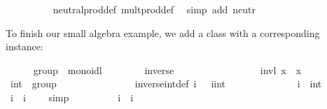 \begin{isabellebody}
\ \ \ \ \ \ \ \ \isamarkupfalse%
\ neutral{\isacharunderscore}prod{\isacharunderscore}def\ mult{\isacharunderscore}prod{\isacharunderscore}def\ \isamarkupfalse%
\ {\isacharparenleft}simp\ add{\isacharcolon}\ neutr{\isacharparenright}\isanewline
\ \ \ \ \isamarkupfalse%
%
\endisatagproof
{\isafoldproof}%
%
\isadelimproof
%
\endisadelimproof
\isanewline
\isanewline
\ \ \ \ \isamarkupfalse%
%
\begin{isamarkuptext}%
\noindent To finish our small algebra example, we add a  class
  with a corresponding instance:%
\end{isamarkuptext}%
\isamarkuptrue%
\ \ \ \ \isamarkupfalse%
\ group\ {\isacharequal}\ monoidl\ {\isacharplus}\isanewline
\ \ \ \ \ \ \ inverse\ {\isacharcolon}{\isacharcolon}\ {\isachardoublequoteopen}{\isasymalpha}\ {\isasymRightarrow}\ {\isasymalpha}{\isachardoublequoteclose}\ \ \ \ {\isacharparenleft}{\isachardoublequoteopen}{\isacharparenleft}{\isacharunderscore}{\isasymdiv}{\isacharparenright}{\isachardoublequoteclose}\ {\isacharbrackleft}{}{}{}{}{\isacharbrackright}\ {}{}{}{\isacharparenright}\isanewline
\ \ \ \ \ \ \ invl{\isacharcolon}\ {\isachardoublequoteopen}x{\isasymdiv}\ {\isasymotimes}\ x\ {\isacharequal}\ {\isasymone}{\isachardoublequoteclose}\isanewline
\isanewline
\ \ \ \ \isamarkupfalse%
\ int\ {\isacharcolon}{\isacharcolon}\ group\isanewline
\ \ \ \ \isanewline
\isanewline
\ \ \ \ \isamarkupfalse%
\isanewline
\ \ \ \ \ \ inverse{\isacharunderscore}int{\isacharunderscore}def{\isacharcolon}\ {\isachardoublequoteopen}i{\isasymdiv}\ {\isacharequal}\ {\isacharminus}\ {\isacharparenleft}i{\isasymColon}int{\isacharparenright}{\isachardoublequoteclose}\isanewline
\isanewline
\ \ \ \ \isamarkupfalse%
%
\isadelimproof
\ %
\endisadelimproof
%
\isatagproof
{}\isamarkupfalse%
\isanewline
\ \ \ \ \ \ \isamarkupfalse%
\ i\ {\isacharcolon}{\isacharcolon}\ int\isanewline
\ \ \ \ \ \ \isamarkupfalse%
\ {\isachardoublequoteopen}{\isacharminus}i\ {\isacharplus}\ i\ {\isacharequal}\ {}{\isachardoublequoteclose}\ \isamarkupfalse%
\ simp\isanewline
\ \ \ \ \ \ \isamarkupfalse%
\ \isamarkupfalse%
\ {\isachardoublequoteopen}i{\isasymdiv}\ {\isasymotimes}\ i\ {\isacharequal}\ {\isasymone}{\isachardoublequoteclose}\isanewline

\end{isabellebody}
